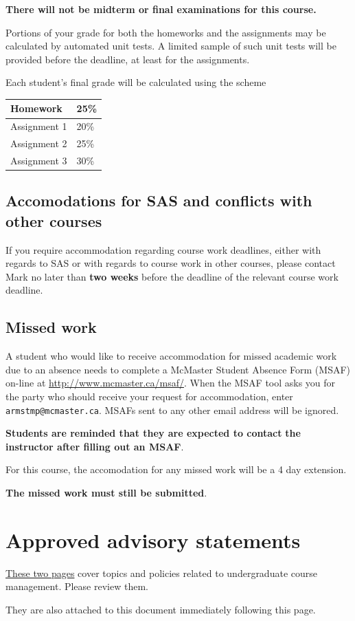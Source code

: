 \documentclass[11pt]{article}
\begin{document}
\textbf{There will not be midterm or final examinations for this course.}

Portions of your grade for both the homeworks and the assignments
may be calculated by automated unit tests.
A limited sample of such unit tests will be provided
before the deadline, at least for the assignments.

Each student's final grade will be calculated using the scheme
\begin{center}
\begin{tabular}{|l|l|}
\hline
Homework & 25\% \\
\hline
Assignment 1 & 20\% \\
\hline
Assignment 2 & 25\% \\
\hline
Assignment 3 & 30\% \\
\hline
\end{tabular}
\end{center}

\subsection{Accomodations for SAS and conflicts with other courses}
\label{sec:orge704d78}
If you require accommodation regarding course work deadlines,
either with regards to SAS or with regards to course work
in other courses, please contact Mark
no later than \textbf{two weeks} before
the deadline of the relevant course work deadline.

\subsection{Missed work}
\label{sec:org90f4910}
A student who would like to receive accommodation
for missed academic work due to an absence
needs to complete a McMaster Student Absence Form (MSAF) on-line at
\url{http://www.mcmaster.ca/msaf/}.
When the MSAF tool asks you for the party
who should receive your request for accommodation,
enter \texttt{armstmp@mcmaster.ca}.
MSAFs sent to any other email address will be ignored.

\textbf{Students are reminded that they are expected to contact}
\textbf{the instructor after filling out an MSAF}.

For this course, the accomodation for any missed work will be
a 4 day extension.
\begin{center}
\textbf{The missed work must still be submitted}.
\end{center}

\section{Approved advisory statements}
\label{sec:orgfaf577e}
\href{./media/outline-advisory-statements.pdf}{These two pages} cover topics and policies
related to undergraduate course management.
Please review them.

They are also attached to this document immediately following this page.


\end{document}
